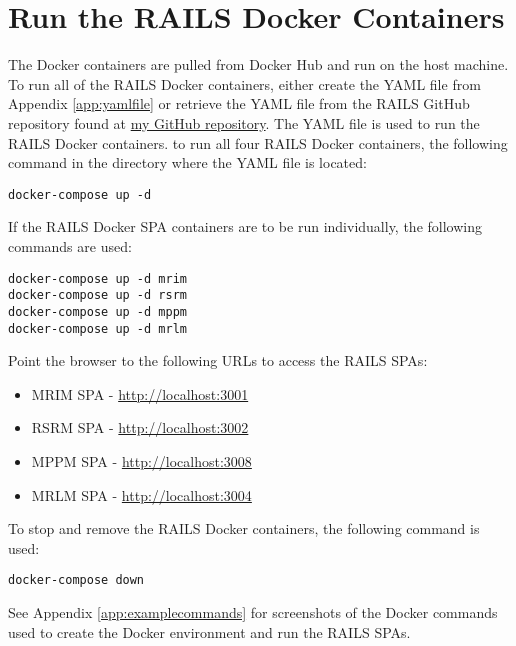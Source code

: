 \section{Run the RAILS Docker Containers}
\label{sec:railsdockercontainers}
The Docker containers are pulled from Docker Hub and run on the host machine. To run all of the \ac{RAILS} Docker containers, either create the YAML file from Appendix \ref{app:yamlfile} or retrieve the YAML file from the \ac{RAILS} GitHub repository found at \href{https://github.com/djbristow/RAILS/tree/master/Docker%20Based}{my GitHub repository}. The YAML file is used to run the \ac{RAILS} Docker containers.  
to run all four \ac{RAILS} Docker containers, the following command in the directory where the YAML file is located:
\begin{verbatim}
docker-compose up -d
\end{verbatim}
If the \ac{RAILS} Docker \ac{SPA} containers are to be run individually, the following commands are used:
\begin{verbatim}
docker-compose up -d mrim
docker-compose up -d rsrm
docker-compose up -d mppm
docker-compose up -d mrlm
\end{verbatim}
Point the browser to the following URLs to access the \ac{RAILS} \acp{SPA}:
\begin{itemize}
    \item \ac{MRIM} \ac{SPA} - \href{http://localhost:3001}{http://localhost:3001}
    \item \ac{RSRM} \ac{SPA} - \href{http://localhost:3002}{http://localhost:3002}
    \item \ac{MPPM} \ac{SPA} - \href{http://localhost:3008}{http://localhost:3008}
    \item \ac{MRLM} \ac{SPA} - \href{http://localhost:3004}{http://localhost:3004}
\end{itemize}
To stop and remove the \ac{RAILS} Docker containers, the following command is used:
\begin{verbatim}
docker-compose down
\end{verbatim}

See Appendix \ref{app:examplecommands} for screenshots of the Docker commands used to create the Docker environment and run the \ac{RAILS} \acp{SPA}.